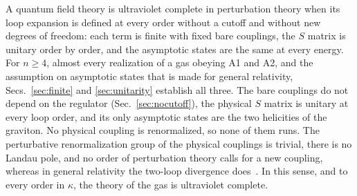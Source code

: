 \documentclass[a4paper,11pt]{article}
\begin{document}
A quantum field theory is ultraviolet complete in perturbation theory when its loop expansion is defined at every order without a cutoff and without new degrees of freedom: each term is finite with fixed bare couplings, the $S$ matrix is unitary order by order, and the asymptotic states are the same at every energy. For $n\ge4$, almost every realization of a gas obeying A1 and A2, and the assumption on asymptotic states that is made for general relativity, Secs.~\ref{sec:finite} and \ref{sec:unitarity} establish all three. The bare couplings do not depend on the regulator (Sec.~\ref{sec:nocutoff}), the physical $S$ matrix is unitary at every loop order, and its only asymptotic states are the two helicities of the graviton. No physical coupling is renormalized, so none of them runs. The perturbative renormalization group of the physical couplings is trivial, there is no Landau pole, and no order of perturbation theory calls for a new coupling, whereas in general relativity the two-loop divergence does~\cite{GoroffSagnotti1986}. In this sense, and to every order in $\kappa$, the theory of the gas is ultraviolet complete.
\end{document}
